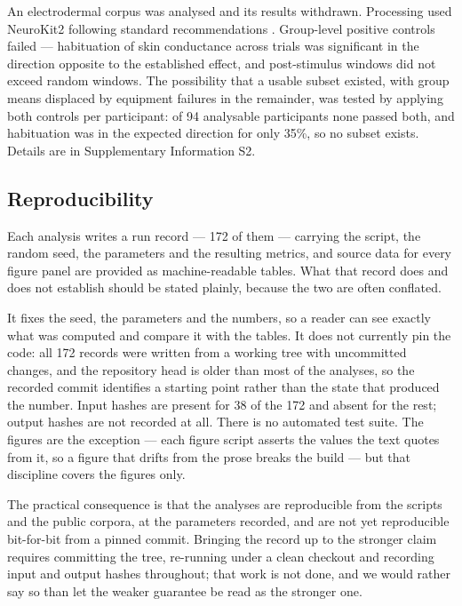 An electrodermal corpus \citep{kutt2022} was analysed and its results withdrawn.
Processing used NeuroKit2 \citep{makowski2021} following standard recommendations
\citep{boucsein2012}. Group-level positive controls failed --- habituation of skin
conductance across trials was significant in the direction opposite to the
established effect, and post-stimulus windows did not exceed random windows. The
possibility that a usable subset existed, with group means displaced by equipment
failures in the remainder, was tested by applying both controls per participant: of
94 analysable participants none passed both, and habituation was in the expected
direction for only 35\%, so no subset exists. Details are in Supplementary
Information S2.

\subsection*{Reproducibility}

Each analysis writes a run record --- 172 of them --- carrying the script, the
random seed, the parameters and the resulting metrics, and source data for every
figure panel are provided as machine-readable tables. What that record does and
does not establish should be stated plainly, because the two are often conflated.

It fixes the seed, the parameters and the numbers, so a reader can see exactly
what was computed and compare it with the tables. It does not currently pin the
code: all 172 records were written from a working tree with uncommitted changes,
and the repository head is older than most of the analyses, so the recorded commit
identifies a starting point rather than the state that produced the number. Input
hashes are present for 38 of the 172 and absent for the rest; output hashes are
not recorded at all. There is no automated test suite. The figures are the
exception --- each figure script asserts the values the text quotes from it, so a
figure that drifts from the prose breaks the build --- but that discipline covers
the figures only.

The practical consequence is that the analyses are reproducible from the scripts
and the public corpora, at the parameters recorded, and are not yet reproducible
bit-for-bit from a pinned commit. Bringing the record up to the stronger claim
requires committing the tree, re-running under a clean checkout and recording
input and output hashes throughout; that work is not done, and we would rather say
so than let the weaker guarantee be read as the stronger one.

